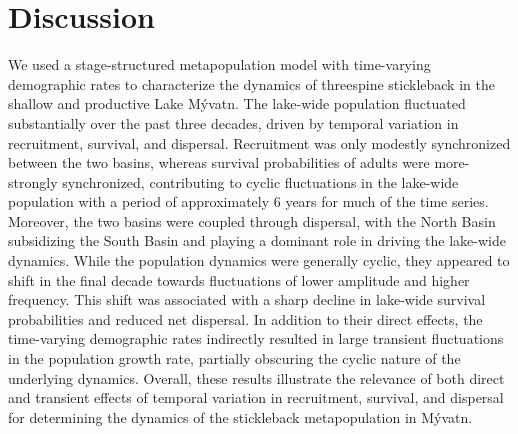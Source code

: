 \documentclass[11pt]{article}
\begin{document}
\section*{Discussion}

We used a stage-structured metapopulation model with time-varying demographic rates 
to characterize the dynamics of threespine stickleback 
in the shallow and productive Lake M\'{y}vatn. 
The lake-wide population fluctuated substantially over the past three decades, 
driven by temporal variation in recruitment, survival, and dispersal. 
Recruitment was only modestly synchronized between the two basins, 
whereas survival probabilities of adults were more-strongly synchronized, 
contributing to cyclic fluctuations in the lake-wide population with a period 
of approximately 6 years for much of the time series. 
Moreover, the two basins were coupled through dispersal, 
with the North Basin subsidizing the South Basin 
and playing a dominant role in driving the lake-wide dynamics. 
While the population dynamics were generally cyclic, 
they appeared to shift in the final decade towards fluctuations 
of lower amplitude and higher frequency. 
This shift was associated with a sharp decline in lake-wide survival probabilities 
and reduced net dispersal. 
In addition to their direct effects, 
the time-varying demographic rates indirectly resulted in large transient fluctuations 
in the population growth rate, 
partially obscuring the cyclic nature of the underlying dynamics. 
Overall, these results illustrate the relevance of both direct and transient effects 
of temporal variation in recruitment, survival, and dispersal 
for determining the dynamics of the stickleback metapopulation in M\'{y}vatn.
\end{document}
